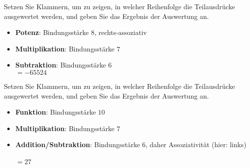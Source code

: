 \begin{frame}
    \begin{exercise}
        Setzen Sie Klammern, um zu zeigen, in welcher Reihenfolge die Teilausdrücke ausgewertet werden, und geben Sie das Ergebnis der Auswertung an.
    \end{exercise}
    \begin{solve}
    \begin{itemize}
        \item \textbf{Potenz}: Bindungsstärke $8$, rechts-assoziativ\hfill{}
        \item \textbf{Multiplikation}: Bindungsstärke $7$\hfill{}
        \item \textbf{Subtraktion}: Bindungsstärke $6$\hfill{}\\
        \hfill$= -65524$
    \end{itemize}
    \end{solve}
\end{frame}
\addtocounter{exercise}{-1}\addtocounter{solve}{-1}%
\begin{frame}
    \begin{exercise}
        Setzen Sie Klammern, um zu zeigen, in welcher Reihenfolge die Teilausdrücke ausgewertet werden, und geben Sie das Ergebnis der Auswertung an.
    \end{exercise}
    \begin{solve}
    \begin{itemize}
        \item \textbf{Funktion}: Bindungsstärke $10$\hfill{}
        \item \textbf{Multiplikation}: Bindungsstärke $7$\hfill{}
        \item \textbf{Addition/Subtraktion}: Bindungsstärke $6$, daher Assoziativität (hier: links)\\\hfill{}\\
        \hfill$= 27$
    \end{itemize}
    \end{solve}
\end{frame}